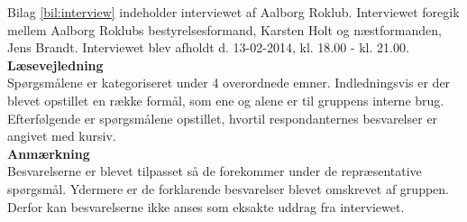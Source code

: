 
\label{bil:interview}
Bilag \ref{bil:interview} indeholder interviewet af Aalborg Roklub. Interviewet foregik mellem Aalborg Roklubs bestyrelsesformand, Karsten Holt og næstformanden, Jens Brandt. Interviewet blev afholdt d. 13-02-2014, kl. 18.00 - kl. 21.00. \\

{\bf Læsevejledning} \\
Spørgsmålene er kategoriseret under 4 overordnede emner. Indledningsvis er der blevet opstillet en række formål, som ene og alene er til gruppens interne brug. Efterfølgende er spørgsmålene opstillet, hvortil respondanternes besvarelser er angivet med kursiv. \\

{\bf Anmærkning} \\
Besvarelserne er blevet tilpasset så de forekommer under de repræsentative spørgsmål. Ydermere er de forklarende besvarelser blevet omskrevet af gruppen. Derfor kan besvarelserne ikke anses som eksakte uddrag fra interviewet. 
